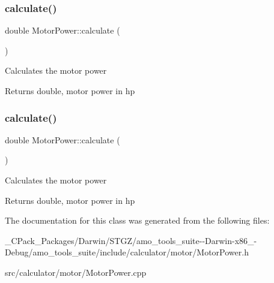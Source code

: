\mbox{\label{class_motor_power_a0beab572e5c46a01e474d6403ec81cf4}} 
\subsubsection{\texorpdfstring{calculate()}{calculate()}\hspace{0.1cm}{\footnotesize\ttfamily [2/3]}}
{\footnotesize\ttfamily double Motor\+Power\+::calculate (\begin{DoxyParamCaption}{ }\end{DoxyParamCaption})}

Calculates the motor power \begin{DoxyReturn}{Returns}
double, motor power in hp 
\end{DoxyReturn}
\mbox{\label{class_motor_power_a0beab572e5c46a01e474d6403ec81cf4}} 
\subsubsection{\texorpdfstring{calculate()}{calculate()}\hspace{0.1cm}{\footnotesize\ttfamily [3/3]}}
{\footnotesize\ttfamily double Motor\+Power\+::calculate (\begin{DoxyParamCaption}{ }\end{DoxyParamCaption})}

Calculates the motor power \begin{DoxyReturn}{Returns}
double, motor power in hp 
\end{DoxyReturn}


The documentation for this class was generated from the following files\+:\begin{DoxyCompactItemize}
\item 
\+\_\+\+C\+Pack\+\_\+\+Packages/\+Darwin/\+S\+T\+G\+Z/amo\+\_\+tools\+\_\+suite-\/-\/\+Darwin-\/x86\+\_-\/\+Debug/amo\+\_\+tools\+\_\+suite/include/calculator/motor/Motor\+Power.\+h\item 
src/calculator/motor/Motor\+Power.\+cpp\end{DoxyCompactItemize}
